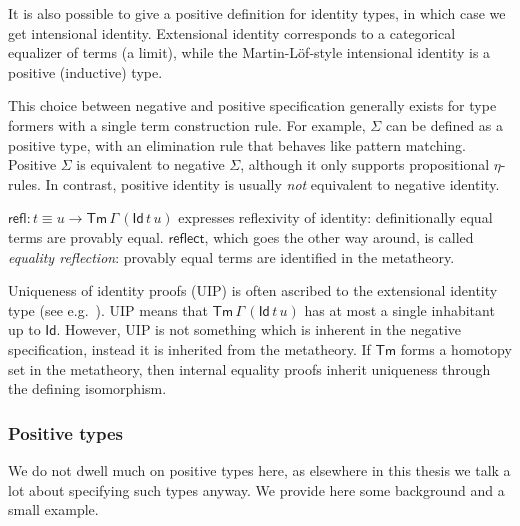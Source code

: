 \documentclass[12pt,a4paper,twoside,openany]{book}
\theoremstyle{remark}
\theoremstyle{definition}
\theoremstyle{theorem}
\newcommand{\refl}{\mathsf{refl}}
\newcommand{\reflect}{\mathsf{reflect}}
\newcommand{\Tm}{\mathsf{Tm}}
\newcommand{\Id}{\mathsf{Id}}
\begin{document}
It is also possible to give a positive definition for identity types, in which
case we get intensional identity. Extensional identity corresponds to a
categorical equalizer of terms (a limit), while the Martin-Löf-style intensional
identity is a positive (inductive) type.

This choice between negative and positive specification generally exists for
type formers with a single term construction rule. For example, $\Sigma$ can be
defined as a positive type, with an elimination rule that behaves like pattern
matching. Positive $\Sigma$ is equivalent to negative $\Sigma$, although it only
supports propositional $\eta$-rules. In contrast, positive identity is usually
\emph{not} equivalent to negative identity.

$\refl : t \equiv u \to \Tm\,\Gamma\,(\Id\,t\,u)$ expresses reflexivity of
identity: definitionally equal terms are provably equal. $\reflect$, which goes
the other way around, is called \emph{equality reflection}: provably equal terms
are identified in the metatheory.

Uniqueness of identity proofs (UIP) is often ascribed to the extensional
identity type (see e.g.\ \cite{hofmann95extensional}). UIP means that
$\Tm\,\Gamma\,(\Id\,t\,u)$ has at most a single inhabitant up to $\Id$. However,
UIP is not something which is inherent in the negative specification, instead it
is inherited from the metatheory. If $\Tm$ forms a homotopy set in the
metatheory, then internal equality proofs inherit uniqueness through the
defining isomorphism.

\subsubsection{Positive types}

We do not dwell much on positive types here, as elsewhere in this thesis we talk
a lot about specifying such types anyway. We provide here some background and
a small example.
\end{document}
